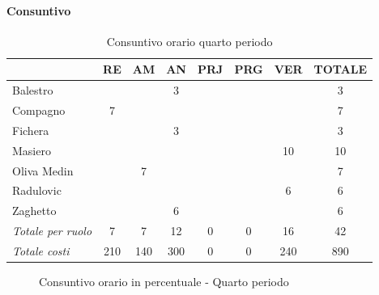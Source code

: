 \documentclass[a4paper,12pt]{article}
\begin{document}
            \paragraph{Consuntivo}
                \begin{table}[H]
                \centering
                \begin{tabular}{|l|c|c|c|c|c|c|c|}
                \hline
                    \rowcolor{lightgray}{\textbf{Membro}} & {\textbf{RE}} & {\textbf{AM}} & {\textbf{AN}} & {\textbf{PRJ}} & {\textbf{PRG}} & {\textbf{VER}} & {\textbf{TOTALE}}\\
                \hline
                    Balestro & & & 3 & & & & 3\\
                \hline
                    Compagno & 7 & & & & & & 7\\
                \hline
                    Fichera & & & 3 & & & & 3\\
                \hline
                    Masiero & & & & & & 10 & 10\\
                \hline
                    Oliva Medin & & 7 & & & & & 7\\
                \hline
                    Radulovic & & & & & & 6 & 6\\
                \hline
                    Zaghetto & & & 6 & & & & 6\\
                \hline
                    \rowcolor{lightgray}\textit{Totale per ruolo} & 7 & 7 & 12 & 0 & 0 & 16 & 42\\
                \hline
                    \rowcolor{lightgray}\textit{Totale costi} & 210 & 140 & 300 & 0 & 0 & 240 & 890\\
                \hline
                \end{tabular}
                \caption{Consuntivo orario quarto periodo}
                \end{table}

                \begin{figure}[H]
                \centering
                \caption{Consuntivo orario in percentuale - Quarto periodo}
                \end{figure}
                
\end{document}
